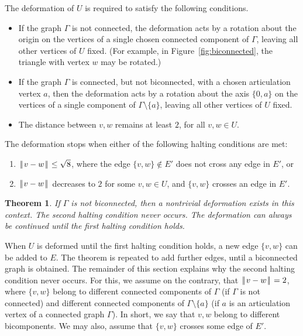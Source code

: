 \documentclass[11pt]{amsart}
\def\|{{\hskip0.1em|\hskip-0.15em|\hskip0.1em}}
\newtheorem{thm}{Theorem}
\begin{document}
The deformation of $U$ is required to satisfy the following conditions.
\begin{itemize}
\item If the graph $\Gamma$ is not connected,
the deformation acts by a rotation about the origin 
on the vertices of a single chosen connected component of $\Gamma$,
leaving all other vertices of $U$ fixed.  (For example, in Figure~\ref{fig:biconnected}, the triangle with vertex $w$ may be rotated.)
\item If the graph $\Gamma$ is connected, but not biconnected, with a chosen articulation vertex $a$, then
the deformation acts by a rotation about the axis $\{0,a\}$ on the vertices of a single component of $\Gamma\setminus\{a\}$,
leaving all other vertices of $U$ fixed.
\item The distance between $v,w$ remains at least $2$, for all $v,w\in U$.
\end{itemize}

The deformation stops when either of the following halting conditions are met:
\begin{enumerate}
\item $\|v-w\|\le\sqrt8$, where the edge $\{v,w\}\not\in E'$ does not cross any edge in $E'$, or
\item $\|v-w\|$ decreases to $2$ for some $v,w\in U$, and $\{v,w\}$ crosses an edge in $E'$.
\end{enumerate}

\begin{thm}\label{thm:biconnected}  
If $\Gamma$ is not biconnected, then a nontrivial deformation exists in this context. 
The second halting condition never occurs.  The deformation can always be continued until the first halting
condition holds.
\end{thm}

When $U$ is deformed until the first halting condition holds, a new edge $\{v,w\}$ can be added to $E$.
The theorem is repeated to add further edges, until a biconnected graph is obtained.  
The remainder of this section explains why the second halting condition never occurs.  For
this, we assume on the contrary, that $\|v-w\|=2$, where $\{v,w\}$ belong to different connected components
of $\Gamma$ (if $\Gamma$ is not connected) and different connected components of $\Gamma\setminus\{a\}$ (if $a$
is an articulation vertex of a connected graph $\Gamma$).  In short, we say that $v,w$ belong to
different bicomponents.  We may also, assume that $\{v,w\}$ crosses some edge of $E'$.
\end{document}
